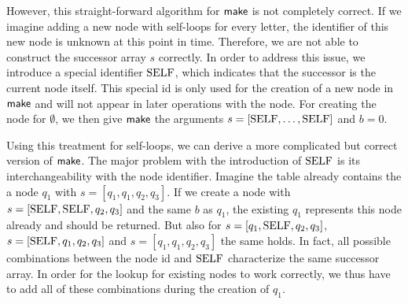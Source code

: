 However, this straight-forward algorithm for $\operatorname{\textsf{make}}$ is not completely correct. If we imagine adding a new node with self-loops for every letter, the identifier of this new node is unknown at this point in time. Therefore, we are not able to construct the successor array $s$ correctly. In order to address this issue, we introduce a special identifier $\mathrm{SELF}$, which indicates that the successor is the current node itself. This special id is only used for the creation of a new node in $\operatorname{\textsf{make}}$ and will not appear in later operations with the node. 
For creating the node for $\emptyset$, we then give $\operatorname{\textsf{make}}$ the arguments $s = [\mathrm{SELF},\dots,\mathrm{SELF}]$ and $b = 0$.

\par

Using this treatment for self-loops, we can derive a more complicated but correct version of $\operatorname{\textsf{make}}$. The major problem with the introduction of $\mathrm{SELF}$ is its interchangeability with the node identifier. Imagine the table already contains the a node $q_{1}$ with $s=[q_{1},q_{1},q_{2},q_{3}]$. If we create a node with $s=[\mathrm{SELF},\mathrm{SELF},q_{2},q_{3}]$ and the same $b$ as $q_{1}$, the existing $q_{1}$ represents this node already and should be returned. But also for $s=[q_{1},\mathrm{SELF},q_{2},q_{3}]$, $s=[\mathrm{SELF},q_{1},q_{2},q_{3}]$ and $s=[q_{1},q_{1},q_{2},q_{3}]$ the same holds. In fact, all possible combinations between the node id and $\mathrm{SELF}$ characterize the same successor array. In order for the lookup for existing nodes to work correctly, we thus have to add all of these combinations during the creation of $q_{1}$.

\par 

